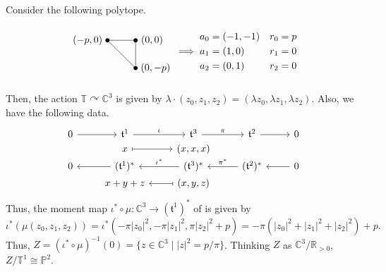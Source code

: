 \documentclass[b5paper,final]{article}
\newcommand{\acton}{\curvearrowright}
\begin{document}
\begin{example}{}
    Consider the following polytope.
    \begin{equation*}
        \begin{tikzpicture}[every node/.style={circle,fill=black,minimum width=1.5pt,inner sep=1.5pt}, baseline={(0,-0.5)}]
            \node[label={0:$(0,0)$}] (A) at (0,0) {};
            \node[label={180:$(-p,0)$}] (B) at (-1,0) {};
            \node[label={0:$(0,-p)$}] (C) at (0,-1) {};
            \draw (A) -- (B) -- (C) -- (A);
        \end{tikzpicture}
        \implies
        \begin{aligned}
            a_0 &= (-1,-1) & r_0 &= p \\
            a_1 &= (1,0) & r_1 &= 0 \\
            a_2 &= (0,1) & r_2 &= 0
        \end{aligned}
    \end{equation*}
    Then, the action $\mathbb{T} \acton \mathbb{C}^3$ is given by $\lambda \cdot (z_0, z_1, z_2) = (\lambda z_0, \lambda z_1, \lambda z_2)$. Also, we have the following data.
    \begin{equation*}
        \begin{tikzcd}[row sep=0ex]
            0 \arrow[r] & \mathfrak{t}^1 \arrow[r, "\iota"] & \mathfrak{t}^3 \arrow[r, "\pi"] & \mathfrak{t}^2 \arrow[r] & 0 \\
            {} & x \arrow[r, maps to] & (x, x, x) & {} & {} \\
            0 & (\mathfrak{t}^1)^* \arrow[l] & (\mathfrak{t}^3)^* \arrow[l, "\iota^*"'] & (\mathfrak{t}^2)^* \arrow[l, "\pi^*"'] & 0 \arrow[l] \\
            {} & x+y+z & (x, y, z) \arrow[l, maps to] & {} & {}
        \end{tikzcd}
    \end{equation*}
    Thus, the moment map $\iota^* \circ \mu : \mathbb{C}^3 \to (\mathfrak{t}^1)^*$ of is given by
    \begin{equation*}
        \iota^*(\mu(z_0, z_1, z_2)) = \iota^*(-\pi|z_0|^2, -\pi|z_1|^2, \pi|z_2|^2+p) = -\pi(|z_0|^2+|z_1|^2+|z_2|^2) + p.
    \end{equation*}
    Thus, $Z = (\iota^* \circ \mu)^{-1}(0) = \{ z \in \mathbb{C}^3 \mid |z|^2 = p/\pi \}$. Thinking $Z$ as $\mathbb{C}^3 / \mathbb{R}_{>0}$, $Z/\mathbb{T}^1 \cong \mathbb{P}^2$.
\end{example}
\end{document}
